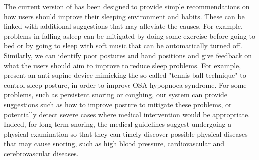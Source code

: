  The current version of {\systemname} has been designed to provide simple recommendations on how users
should improve their sleeping environment and habits. These can be linked with additional suggestions that may alleviate the causes. For
example, problems in falling asleep can be mitigated by doing some exercise before going to bed or by going to sleep with soft music that
can be automatically turned off. Similarly, we can identify poor postures and hand positions and give feedback on what the users should aim
to improve to reduce sleep problems. For example, \cite{posture} present an anti-supine device mimicking the so-called "tennis ball
technique" to control sleep posture, in order to improve OSA hypopnoea syndrome. For some problems, such as persistent snoring or coughing,
our system can provide suggestions such as how to improve posture to mitigate these problems, or potentially detect severe cases where
medical intervention would be appropriate. Indeed, for long-term snoring, the medical guidelines suggest undergoing a physical examination
so that they can timely discover possible physical diseases that may cause snoring, such as high blood pressure, cardiovascular and
cerebrovascular diseases.
